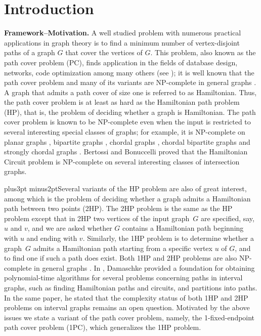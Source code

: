 \documentclass[10pt]{article}
\def\yskip{\penalty-50\vskip3pt plus3pt minus2pt}
\def\y{\yskip}
\begin{document}
\vskip 0.3in \section{Introduction}
{\bf Framework--Motivation.} A well studied problem with numerous
practical applications in graph theory is to find a minimum number
of vertex-disjoint paths of a graph $G$ that cover the vertices of
$G$. This problem, also known as the path cover problem (PC),
finds application in the fields of database design, networks, code
optimization among many others (see \cite{AdPe90, AR90, LiOlPru95,
SSSR93}); it is well known that the path cover problem and many of
its variants are NP-complete in general graphs \cite{GaJo79}. A
graph that admits a path cover of size one is referred to as
Hamiltonian. Thus, the path cover problem is at least as hard as
the Hamiltonian path problem (HP), that is, the problem of
deciding whether a graph is Hamiltonian. The path cover problem is
known to be NP-complete even when the input is restricted to
several interesting special classes of graphs; for example, it is
NP-complete on planar graphs \cite{GaJoTar}, bipartite graphs
\cite{Gol}, chordal graphs \cite{Gol}, chordal bipartite graphs
\cite{Muller} and strongly chordal graphs \cite{Muller}. Bertossi
and Bonuccelli \cite{BertBonucc} proved that the Hamiltonian
Circuit problem is NP-complete on several interesting classes of
intersection graphs.

\y Several variants of the HP problem are also of great interest,
among which is the problem of deciding whether a graph admits a
Hamiltonian path between two points (2HP). The 2HP problem is the
same as the HP problem except that in 2HP two vertices of the
input graph~$G$ are specified, say, $u$ and $v$,  and we are asked
whether $G$ contains a Hamiltonian path beginning with $u$ and
ending with $v$. Similarly, the 1HP problem is to determine
whether a graph~$G$ admits a Hamiltonian path starting from a
specific vertex $u$ of $G$, and to find one if such a path does
exist. Both 1HP and 2HP problems are also NP-complete in general
graphs \cite{GaJo79}. In \cite{Damaschke}, Damaschke provided a
foundation for obtaining polynomial-time algorithms for several
problems concerning paths in interval graphs, such as finding
Hamiltonian paths and circuits, and partitions into paths. In the
same paper, he stated that the complexity status of both 1HP and
2HP problems on interval graphs remains an open question.
Motivated by the above issues we state a variant of the path cover
problem, namely, the 1-fixed-endpoint path cover problem (1PC),
which generalizes the 1HP problem.
\end{document}
